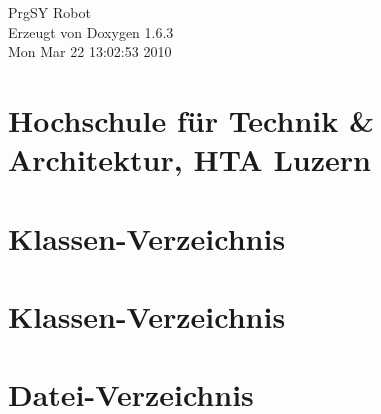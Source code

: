 \documentclass[a4paper]{book}
\begin{document}
\hypersetup{pageanchor=false}
\begin{titlepage}
\vspace*{7cm}
\begin{center}
{\Large PrgSY Robot }\\
\vspace*{1cm}
{\large Erzeugt von Doxygen 1.6.3}\\
\vspace*{0.5cm}
{\small Mon Mar 22 13:02:53 2010}\\
\end{center}
\end{titlepage}
\clearemptydoublepage
{}
\tableofcontents
\clearemptydoublepage
{}
\hypersetup{pageanchor=true}
\chapter{Hochschule f\"{u}r Technik \& Architektur, HTA Luzern}
\label{index}\hypertarget{index}{}
\chapter{Klassen-\/Verzeichnis}

\chapter{Klassen-\/Verzeichnis}

\chapter{Datei-\/Verzeichnis}

\end{document}
